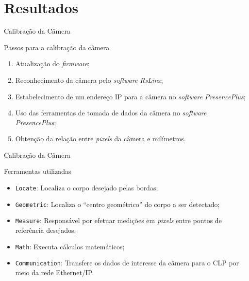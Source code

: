 \documentclass[10pt]{beamer}
\begin{document}
%
%
%

\section{Resultados}

\begin{frame}[fragile]{Calibração da Câmera}
\begin{block}{Passos para a calibração da câmera}
\begin{enumerate}
	\item Atualização do \textit{firmware};
	\item Reconhecimento da câmera pelo \textit{software RsLinx};
	\item Estabelecimento de um endereço IP para a câmera no \textit{software PresencePlus};
	\item Uso das ferramentas de tomada de dados da câmera no \textit{software PresencePlus};
	\item Obtenção da relação entre \textit{pixels} da câmera e milímetros.
\end{enumerate}
\end{block}
\end{frame}

\begin{frame}[fragile]{Calibração da Câmera}
\begin{block}{Ferramentas utilizadas}
\begin{itemize}
	\item \texttt{Locate}: Localiza o corpo desejado pelas bordas;
	\item \texttt{Geometric}: Localiza o ``centro geométrico'' do corpo a ser detectado;
	\item \texttt{Measure}: Responsável por efetuar medições em \textit{pixels} entre pontos de referência desejados;
	\item \texttt{Math}: Executa cálculos matemáticos;
	\item \texttt{Communication}: Transfere os dados de interesse da câmera para o CLP por meio da rede Ethernet/IP.
\end{itemize}
\end{block}
\end{frame}
\end{document}
